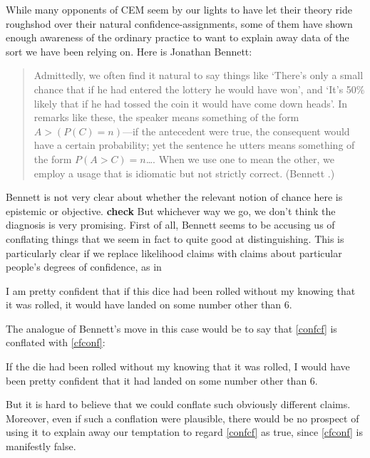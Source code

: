 \documentclass[If.tex]{subfiles}
\begin{document}
While many opponents of CEM seem by our lights to have let their theory ride roughshod over their natural confidence-assignments, some of them have shown enough awareness of the ordinary practice to want to explain away data of the sort we have been relying on. Here is Jonathan Bennett:
\begin{quote}
	Admittedly, we often find it natural to say things like `There's only a small chance that if he had entered the lottery he would have won', and `It's 50\% likely that if he had tossed the coin it would have come down heads'. In remarks like these, the speaker means something of the form $A>(P(C)=n)$---if the antecedent were true, the consequent would have a certain probability; yet the sentence he utters means something of the form $P(A>C)=n$\ldots{}. When we use one to mean the other, we employ a usage that is idiomatic but not strictly correct. (Bennett .) 
\end{quote}
Bennett is not very clear about whether the relevant notion of chance here is epistemic or objective. \textbf{check} But whichever way we go, we don't think the diagnosis is very promising. First of all, Bennett seems to be accusing us of conflating things that we seem in fact to quite good at distinguishing. This is particularly clear if we replace likelihood claims with claims about particular people's degrees of confidence, as in
\begin{prop}
	\nitem \label{confcf}
	I am pretty confident that if this dice had been rolled without my knowing that it was rolled, it would have landed on some number other than 6.
\end{prop}
The analogue of Bennett's move in this case would be to say that \ref{confcf} is conflated with \ref{cfconf}:
\begin{prop}
	\nitem \label{cfconf}
	If the die had been rolled without my knowing that it was rolled, I
	would have been pretty confident that it had landed on some number
	other than 6.
\end{prop}
But it is hard to believe that we could conflate such obviously different claims. Moreover, even if such a conflation were plausible, there would be no prospect of using it to explain away our temptation to regard \ref{confcf} as true, since \ref{cfconf} is manifestly false.
\end{document}

